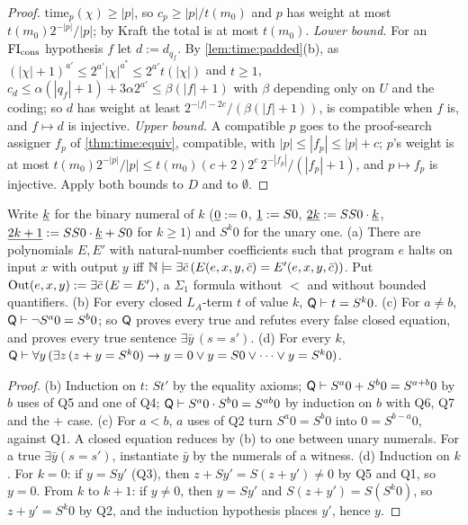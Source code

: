 \begin{proof}
$\mathrm{time}_p(\chi)\ge|p|$, so $c_p\ge|p|/t(m_0)$ and $p$ has weight at most $t(m_0)2^{-|p|}/|p|$; by Kraft the total is at most $t(m_0)$. \emph{Lower bound.} For an $\mathrm{FI}_{\mathrm{cons}}$ hypothesis $f$ let $d:=d_{q_f}$. By \cref{lem:time:padded}(b), as $(|\chi|+1)^{a'}\le2^{a'}|\chi|^{a^*}\le2^{a'}t(|\chi|)$ and $t\ge1$, $c_d\le\alpha(|q_f|+1)+3\alpha2^{a'}\le\beta(|f|+1)$ with $\beta$ depending only on $U$ and the coding; so $d$ has weight at least $2^{-|f|-2c}/(\beta(|f|+1))$, is compatible when $f$ is, and $f\mapsto d$ is injective. \emph{Upper bound.} A compatible $p$ goes to the proof-search assigner $f_p$ of \cref{thm:time:equiv}, compatible, with $|p|\le|f_p|\le|p|+c$; $p$'s weight is at most $t(m_0)2^{-|p|}/|p|\le t(m_0)(c+2)2^c\,2^{-|f_p|}/(|f_p|+1)$, and $p\mapsto f_p$ is injective. Apply both bounds to $D$ and to $\emptyset$.
\end{proof}

\begin{lemma}\label{lem:time:qfacts}
Write $\underline{k}$ for the binary numeral of $k$ ($\underline{0}:=0$, $\underline{1}:=S0$, $\underline{2k}:=SS0\cdot\underline{k}$, $\underline{2k+1}:=SS0\cdot\underline{k}+S0$ for $k\ge1$) and $S^k0$ for the unary one.
(a)  There are polynomials $E,E'$ with natural-number coefficients such that program $e$ halts on input $x$ with output $y$ iff $\mathbb{N}\models\exists\bar c\,(E(e,x,y,\bar c)=E'(e,x,y,\bar c))$. Put $\mathrm{Out}(e,x,y):=\exists\bar c\,(E=E')$, a $\Sigma_1$ formula without $<$ and without bounded quantifiers.
(b)  For every closed $L_A$-term $t$ of value $k$, $\mathsf{Q}\vdash t=S^k0$.
(c)  For $a\ne b$, $\mathsf{Q}\vdash\neg S^a0=S^b0$; so $\mathsf{Q}$ proves every true and refutes every false closed equation, and proves every true sentence $\exists\bar y\,(s=s')$.
(d)  For every $k$, $\mathsf{Q}\vdash\forall y\,(\exists z\,(z+y=S^k0)\to y=0\vee y=S0\vee\dots\vee y=S^k0)$.
\end{lemma}

\begin{proof}
(b) Induction on $t$: $St'$ by the equality axioms; $\mathsf{Q}\vdash S^a0+S^b0=S^{a+b}0$ by $b$ uses of Q5 and one of Q4; $\mathsf{Q}\vdash S^a0\cdot S^b0=S^{ab}0$ by induction on $b$ with Q6, Q7 and the $+$ case. (c) For $a<b$, $a$ uses of Q2 turn $S^a0=S^b0$ into $0=S^{b-a}0$, against Q1. A closed equation reduces by (b) to one between unary numerals. For a true $\exists\bar y(s=s')$, instantiate $\bar y$ by the numerals of a witness. (d) Induction on $k$. For $k=0$: if $y=Sy'$ (Q3), then $z+Sy'=S(z+y')\ne0$ by Q5 and Q1, so $y=0$. From $k$ to $k+1$: if $y\ne0$, then $y=Sy'$ and $S(z+y')=S(S^k0)$, so $z+y'=S^k0$ by Q2, and the induction hypothesis places $y'$, hence $y$.
\end{proof}

